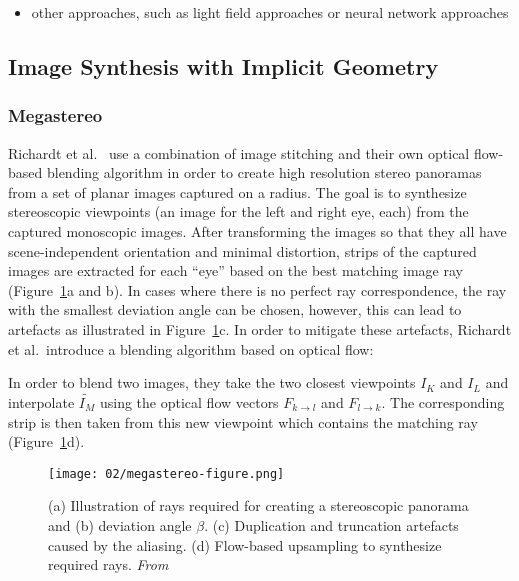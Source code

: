 \begin{itemize}
  \item other approaches, such as light field approaches or neural network approaches
\end{itemize}

\subsection{Image Synthesis with Implicit Geometry}

\subsubsection{Megastereo \label{subsec:megastereo}}
Richardt et al.\ \cite{megastereo} use a combination of image stitching and their own optical flow-based blending algorithm in order to create high resolution stereo panoramas from a set of planar images captured on a radius. The goal is to synthesize stereoscopic viewpoints (an image for the left and right eye, each) from the captured monoscopic images. After transforming the images so that they all have scene-independent orientation and minimal distortion, strips of the captured images are extracted for each ``eye'' based on the best matching image ray (Figure~\ref{fig:megastereo-figure}a and b). In cases where there is no perfect ray correspondence, the ray with the smallest deviation angle can be chosen, however, this can lead to artefacts as illustrated in Figure~\ref{fig:megastereo-figure}c. In order to mitigate these artefacts, Richardt et al.\ introduce a blending algorithm based on optical flow: 

In order to blend two images, they take the two closest viewpoints $I_K$ and $I_L$ and interpolate $\widetilde{I_M}$ using the optical flow vectors $F_{k\rightarrow l}$ and $F_{l\rightarrow k}$.  The corresponding strip is then taken from this new viewpoint which contains the matching ray (Figure~\ref{fig:megastereo-figure}d).

\begin{figure}[]
\centering
\texttt{[image: 02/megastereo-figure.png]}
\caption[Flow-based blending in Megastereo]{(a) Illustration of rays required for creating a stereoscopic panorama and (b) deviation angle $\beta$. (c) Duplication and truncation artefacts caused by the aliasing. (d) Flow-based upsampling to synthesize required rays. \emph{From \cite{megastereo}}}
\label{fig:megastereo-figure}
\end{figure}

